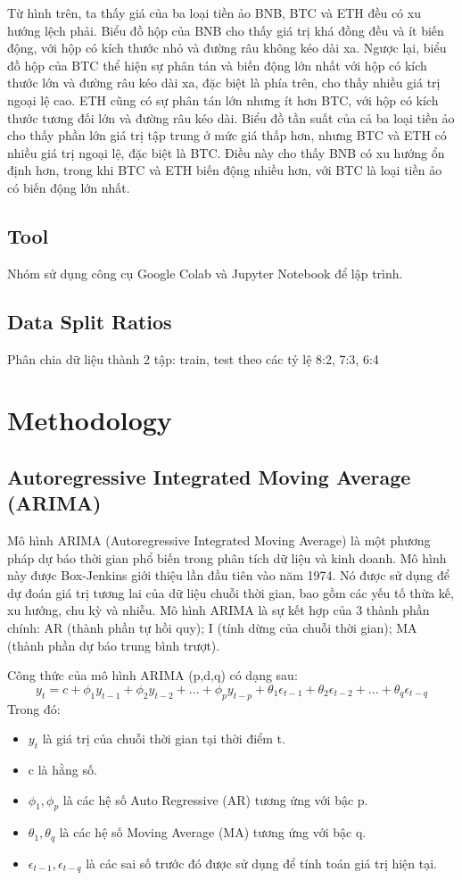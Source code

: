 \documentclass[conference]{IEEEtran}
\begin{document}
Từ hình trên, ta thấy giá của ba loại tiền ảo BNB, BTC và ETH đều có xu hướng lệch phải. Biểu đồ hộp của BNB cho thấy giá trị khá đồng đều và ít biến động, với hộp có kích thước nhỏ và đường râu không kéo dài xa. Ngược lại, biểu đồ hộp của BTC thể hiện sự phân tán và biến động lớn nhất với hộp có kích thước lớn và đường râu kéo dài xa, đặc biệt là phía trên, cho thấy nhiều giá trị ngoại lệ cao. ETH cũng có sự phân tán lớn nhưng ít hơn BTC, với hộp có kích thước tương đối lớn và đường râu kéo dài. Biểu đồ tần suất của cả ba loại tiền ảo cho thấy phần lớn giá trị tập trung ở mức giá thấp hơn, nhưng BTC và ETH có nhiều giá trị ngoại lệ, đặc biệt là BTC. Điều này cho thấy BNB có xu hướng ổn định hơn, trong khi BTC và ETH biến động nhiều hơn, với BTC là loại tiền ảo có biến động lớn nhất.

\subsection{Tool}
Nhóm sử dụng công cụ Google Colab và Jupyter Notebook để lập trình.

\subsection{Data Split Ratios}
Phân chia dữ liệu thành 2 tập: train, test theo các tỷ lệ 8:2, 7:3, 6:4

\section{Methodology}
\subsection{Autoregressive Integrated Moving Average (ARIMA)}
Mô hình ARIMA (Autoregressive Integrated Moving Average) là một phương pháp dự báo thời gian phổ biến trong phân tích dữ liệu và kinh doanh. Mô hình này được Box-Jenkins giới thiệu lần đầu tiên vào năm 1974. Nó được sử dụng để dự đoán giá trị tương lai của dữ liệu chuỗi thời gian, bao gồm các yếu tố thừa kế, xu hướng, chu kỳ và nhiễu.
Mô hình ARIMA là sự kết hợp của 3 thành phần chính: AR (thành phần tự hồi quy); I (tính dừng của chuỗi thời gian); MA (thành phần dự báo trung bình trượt).

Công thức của mô hình ARIMA (p,d,q) có dạng sau:
\[
y_{t} = c + \phi_{1}y_{t-1} + \phi_{2}y_{t-2} + ... + \phi_{p}y_{t-p} + \theta_{1}\epsilon_{t-1} + \theta_{2}\epsilon_{t-2} + ... + \theta_{q}\epsilon_{t-q}
\]
Trong đó:
\begin{itemize}
    \item \(y_{t}\) là giá trị của chuỗi thời gian tại thời điểm t.
    \item c là hằng số.
    \item \(\phi_{1}, \phi_{p}\) là các hệ số Auto Regressive (AR) tương ứng với bậc p.
    \item \(\theta_{1}, \theta_{q}\) là các hệ số Moving Average (MA) tương ứng với bậc q.
    \item \(\epsilon_{t-1}, \epsilon_{t-q}\) là các sai số trước đó được sử dụng để tính toán giá trị hiện tại.
\end{itemize}
\end{document}
